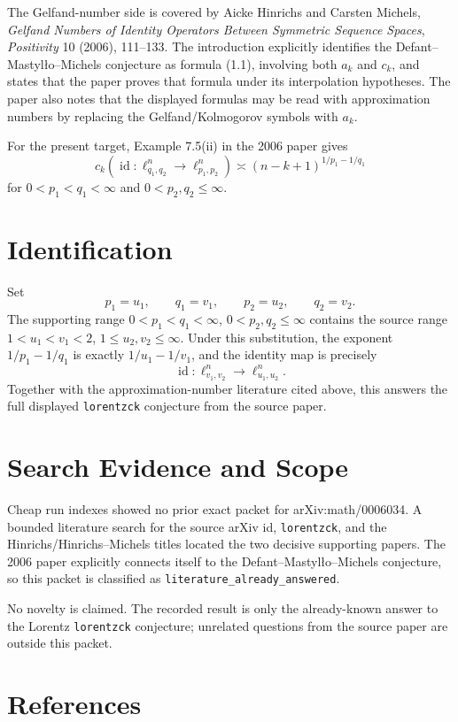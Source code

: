 \documentclass[11pt]{article}
\begin{document}
The Gelfand-number side is covered by Aicke Hinrichs and Carsten Michels,
\emph{Gelfand Numbers of Identity Operators Between Symmetric Sequence Spaces},
\emph{Positivity} 10 (2006), 111--133.  The introduction explicitly identifies
the Defant--Mastyl\l{}o--Michels conjecture as formula (1.1), involving both
\(a_k\) and \(c_k\), and states that the paper proves that formula under its
interpolation hypotheses.  The paper also notes that the displayed formulas may
be read with approximation numbers by replacing the Gelfand/Kolmogorov symbols
with \(a_k\).

For the present target, Example 7.5(ii) in the 2006 paper gives
\[
  c_k\!\left(\operatorname{id}:
    \ell_{q_1,q_2}^n \to \ell_{p_1,p_2}^n\right)
  \asymp
  (n-k+1)^{1/p_1-1/q_1}
\]
for \(0<p_1<q_1<\infty\) and \(0<p_2,q_2\leq\infty\).

\section*{Identification}

Set
\[
  p_1=u_1,\qquad q_1=v_1,\qquad p_2=u_2,\qquad q_2=v_2 .
\]
The supporting range \(0<p_1<q_1<\infty\), \(0<p_2,q_2\leq\infty\) contains the
source range \(1<u_1<v_1<2\), \(1\leq u_2,v_2\leq\infty\).  Under this
substitution, the exponent \(1/p_1-1/q_1\) is exactly \(1/u_1-1/v_1\), and the
identity map is precisely
\[
  \operatorname{id}:\ell_{v_1,v_2}^n\to\ell_{u_1,u_2}^n .
\]
Together with the approximation-number literature cited above, this answers
the full displayed \texttt{lorentzck} conjecture from the source paper.

\section*{Search Evidence and Scope}

Cheap run indexes showed no prior exact packet for arXiv:math/0006034.  A
bounded literature search for the source arXiv id, \texttt{lorentzck}, and the
Hinrichs/Hinrichs--Michels titles located the two decisive supporting papers.
The 2006 paper explicitly connects itself to the Defant--Mastyl\l{}o--Michels
conjecture, so this packet is classified as \texttt{literature\_already\_answered}.

No novelty is claimed.  The recorded result is only the already-known answer to
the Lorentz \texttt{lorentzck} conjecture; unrelated questions from the source
paper are outside this packet.

\section*{References}
\end{document}
